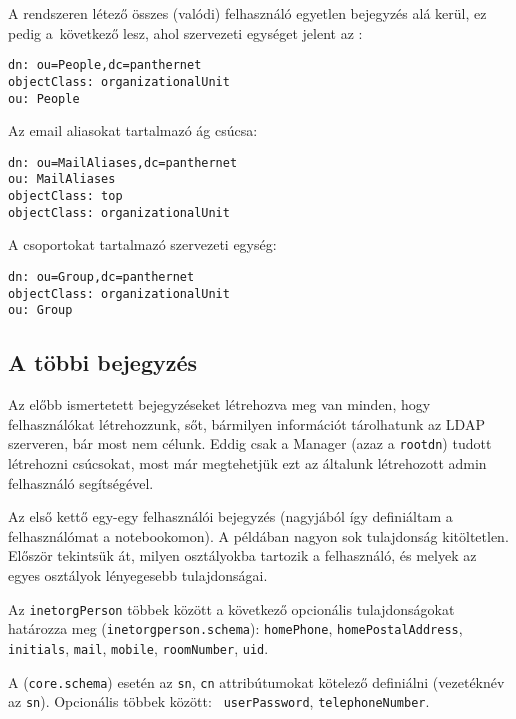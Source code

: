 \noindent A rendszeren létező összes (valódi) felhasználó egyetlen bejegyzés alá kerül, ez pedig a~következő lesz, ahol
szervezeti egységet jelent az :

\begin{Verbatim}[frame=single]
dn: ou=People,dc=panthernet
objectClass: organizationalUnit
ou: People  
\end{Verbatim}


\noindent Az email aliasokat tartalmazó ág csúcsa:

\begin{Verbatim}[frame=single]
dn: ou=MailAliases,dc=panthernet
ou: MailAliases
objectClass: top
objectClass: organizationalUnit
\end{Verbatim}


\noindent A csoportokat tartalmazó szervezeti egység:

\begin{Verbatim}[frame=single]
dn: ou=Group,dc=panthernet
objectClass: organizationalUnit
ou: Group
\end{Verbatim}



\subsection{A többi bejegyzés}
Az előbb ismertetett bejegyzéseket létrehozva meg van minden, hogy felhasználókat létrehozzunk, sőt, bármilyen
információt tárolhatunk az LDAP szerveren, bár most nem célunk. Eddig csak a Manager (azaz a \texttt{rootdn}) tudott
létrehozni csúcsokat, most már megtehetjük ezt az általunk létrehozott admin felhasználó segítségével.


Az első kettő egy-egy felhasználói bejegyzés (nagyjából így definiáltam a felhasználómat a notebookomon).
A példában nagyon sok tulajdonság kitöltetlen. Először tekintsük át, milyen osztályokba tartozik a felhasználó, és
melyek az egyes osztályok lényegesebb tulajdonságai.

Az \texttt{inetorgPerson} többek között a következő opcionális tulajdonságokat határozza meg
(\texttt{inetorgperson.schema}):
\texttt{homePhone}, \texttt{homePostalAddress}, \texttt{initials}, \texttt{mail},  \texttt{mobile},
\texttt{roomNumber}, \texttt{uid}.

A  (\texttt{core.schema}) esetén az \texttt{sn}, \texttt{cn} attribútumokat kötelező definiálni
(vezetéknév az \texttt{sn}). Opcionális többek között: \texttt{ userPassword}, \texttt{telephoneNumber}.

